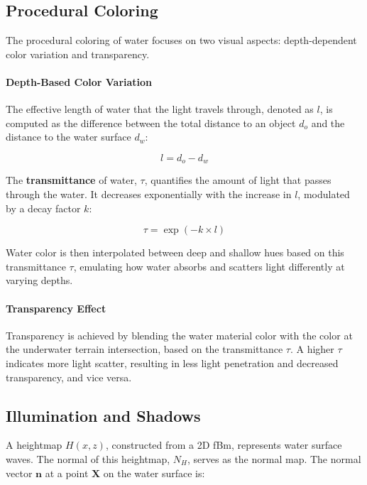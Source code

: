 \subsection{Procedural Coloring}

The procedural coloring of water focuses on two visual aspects: depth-dependent color variation and transparency. 

\paragraph{Depth-Based Color Variation}
   
The effective length of water that the light travels through, denoted as $l$, is computed as the difference between the total distance to an object $d_{o}$ and the distance to the water surface $d_{w}$:

\begin{equation}
   l = d_{o}-d_w
\end{equation}

The \textbf{transmittance} of water, $\tau$, quantifies the amount of light that passes through the water. It decreases exponentially with the increase in $l$, modulated by a decay factor $k$:

\begin{equation}
    \tau = \exp(-k \times l)
\end{equation}
   
Water color is then interpolated between deep and shallow hues based on this transmittance $\tau$, emulating how water absorbs and scatters light differently at varying depths.

\paragraph{Transparency Effect}

Transparency is achieved by blending the water material color with the color at the underwater terrain intersection, based on the transmittance $\tau$. A higher $\tau$ indicates more light scatter, resulting in less light penetration and decreased transparency, and vice versa.

\subsection{Illumination and Shadows}
\label{Water Shading}

A heightmap $H(x,z)$, constructed from a 2D fBm, represents water surface waves. The normal of this heightmap, $N_H$, serves as the normal map. The normal vector $\mathbf{n}$ at a point $\mathbf{X}$ on the water surface is:

